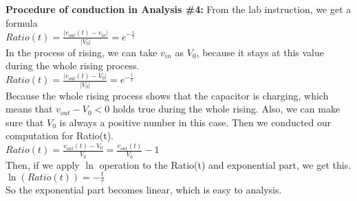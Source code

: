 \textbf{Procedure of conduction in Analysis \#4:} \newline
\phantom{ } From the lab instruction, we get a formula\\
$Ratio(t) = \frac{|v_{out}(t) - v_{in}|}{|V_0|} = e^{-\frac{t}{\tau}}$\\
\phantom{ } In the process of rising, we can take $v_{in}$ as $V_0$, because it stays at this value during the whole rising process.\\
$Ratio(t) = \frac{|v_{out}(t) - V_0|}{|V_0|} = e^{-\frac{t}{\tau}}$\\
\phantom{ } Because the whole rising process shows that the capacitor is charging, which means that $v_{out} - V_0 < 0$ holds true during the whole rising. Also, we can make sure that $V_0$ is always a positive number in this case. Then we conducted our 
computation for Ratio(t).\\
$Ratio(t) = \frac{v_{out}(t) - V_0}{V_0} = \frac{v_{out}(t)}{V_0} - 1$\\
\phantom{ } Then, if we apply $\ln$ operation to the Ratio(t) and exponential part, we get this.\\
$\ln(Ratio(t)) = -\frac{t}{\tau}$\\
\phantom{ } So the exponential part becomes linear, which is easy to analysis.\\